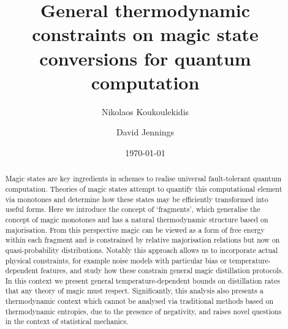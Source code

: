 \documentclass[pra,
aps,
twocolumn,
superscriptaddress,
groupedaddress,
nofootinbib,
reprint
]{revtex4-1}
\begin{document}



\begin{abstract}
\ddd{[To be sharpened]} Magic states are key ingredients in schemes to realise universal fault-tolerant quantum computation.
Theories of magic states attempt to quantify this computational element via monotones and determine how these states may be efficiently transformed into useful forms. Here we introduce the concept of `fragments', which generalise the concept of magic monotones and has a natural thermodynamic structure based on majorisation. From this perspective magic can be viewed as a form of free energy within each fragment and is constrained by relative majorisation relations but now on quasi-probability distributions. Notably this approach allows us to incorporate actual physical constraints, for example noise models with particular bias or temperature-dependent features, and study how these constrain general magic distillation protocols. In this context we present general temperature-dependent bounds on distillation rates that any theory of magic must respect. Significantly, this analysis also presents a thermodynamic context which cannot be analysed via traditional methods based on thermodynamic entropies, due to the presence of negativity, and raises novel questions in the context of statistical mechanics.
\end{abstract}


\title{General thermodynamic constraints on magic state conversions for quantum computation}

\author{Nikolaos Koukoulekidis}
\author{David Jennings}

\date{\today}
\maketitle
\end{document}
